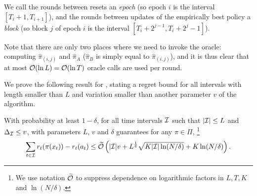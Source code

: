 We call the rounds between resets an {\it epoch} (so epoch $i$ is the interval $[T_i+1, T_{i+1}]$), 
and the rounds between updates of the empirically best policy a {\it block} (so block $j$ of epoch $i$ is the interval $[T_i+2^{j-1}, T_i+2^{j}-1]$).

Note that there are only two places where we need to invoke the oracle: computing $\hat{\pi}_{(i,j)}$ and $\hat{\pi}_{A}$ 
($\hat{\pi}_{B}$ is simply equal to $\hat{\pi}_{(i,j)}$),
and it is thus clear that at most $\mathcal{O}(\ln L) = \mathcal{O}(\ln T)$ oracle calls are used per round.


We prove the following result for \AdaEG, stating a regret bound for all intervals with length smaller than $L$
and variation smaller than another parameter $v$ of the algorithm.
\begin{theorem}\label{thm:AdaEG2}
With probability at least $1 - \delta$, for all time intervals ${\mathcal{I}}$
such that $|{\mathcal{I}}| \leq L$ and $\Delta_{\mathcal{I}} \leq v$, \AdaEG with
parameters $L$, $v$ and $\delta$ guarantees for any $\pi \in
\Pi$,%
\footnote{We use notation $\widetilde{\mathcal{O}}$ to suppress dependence on
  logarithmic factors in $L, T, K$ and $\ln(N/\delta)$. } 
\[
\sum_{t \in {\mathcal{I}}} r_t(\pi(x_t)) - r_t(a_t) \leq \widetilde{\mathcal{O}}\left(\lvert{\mathcal{I}}\rvert v +
L^\frac{1}{6}\sqrt{K\lvert{\mathcal{I}}\rvert\ln(N/\delta)} + K\ln(N/\delta)\right).
\]
\end{theorem}

